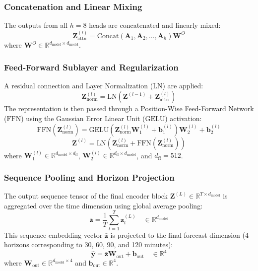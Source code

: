 \documentclass[10pt,journal,compsoc,twocolumn]{IEEEtran}
\begin{document}
\subsubsection{Concatenation and Linear Mixing}
The outputs from all $h = 8$ heads are concatenated and linearly mixed:
\begin{equation}
\mathbf{Z}_{\text{attn}}^{(l)} = \text{Concat}\left(\mathbf{A}_1, \mathbf{A}_2, \dots, \mathbf{A}_h\right)\mathbf{W}^O
\end{equation}
where $\mathbf{W}^O \in \mathbb{R}^{d_{\text{model}} \times d_{\text{model}}}$.

\subsubsection{Feed-Forward Sublayer and Regularization}
A residual connection and Layer Normalization ($\text{LN}$) are applied:
\begin{equation}
\mathbf{Z}_{\text{norm}}^{(l)} = \text{LN}\left(\mathbf{Z}^{(l-1)} + \mathbf{Z}_{\text{attn}}^{(l)}\right)
\end{equation}
The representation is then passed through a Position-Wise Feed-Forward Network ($\text{FFN}$) using the Gaussian Error Linear Unit ($\text{GELU}$) activation:
\begin{equation}
\text{FFN}\left(\mathbf{Z}_{\text{norm}}^{(l)}\right) = \text{GELU}\left(\mathbf{Z}_{\text{norm}}^{(l)}\mathbf{W}_1^{(l)} + \mathbf{b}_1^{(l)}\right)\mathbf{W}_2^{(l)} + \mathbf{b}_2^{(l)}
\end{equation}
\begin{equation}
\mathbf{Z}^{(l)} = \text{LN}\left(\mathbf{Z}_{\text{norm}}^{(l)} + \text{FFN}\left(\mathbf{Z}_{\text{norm}}^{(l)}\right)\right)
\end{equation}
where $\mathbf{W}_1^{(l)} \in \mathbb{R}^{d_{\text{model}} \times d_{\text{ff}}}$, $\mathbf{W}_2^{(l)} \in \mathbb{R}^{d_{\text{ff}} \times d_{\text{model}}}$, and $d_{\text{ff}} = 512$.

\subsubsection{Sequence Pooling and Horizon Projection}
The output sequence tensor of the final encoder block $\mathbf{Z}^{(L)} \in \mathbb{R}^{T \times d_{\text{model}}}$ is aggregated over the time dimension using global average pooling:
\begin{equation}
\bar{\mathbf{z}} = \frac{1}{T} \sum_{t=1}^T \mathbf{z}_t^{(L)} \quad \in \mathbb{R}^{d_{\text{model}}}
\end{equation}
This sequence embedding vector $\bar{\mathbf{z}}$ is projected to the final forecast dimension (4 horizons corresponding to 30, 60, 90, and 120 minutes):
\begin{equation}
\hat{\mathbf{y}} = \bar{\mathbf{z}}\mathbf{W}_{\text{out}} + \mathbf{b}_{\text{out}} \quad \in \mathbb{R}^4
\end{equation}
where $\mathbf{W}_{\text{out}} \in \mathbb{R}^{d_{\text{model}} \times 4}$ and $\mathbf{b}_{\text{out}} \in \mathbb{R}^4$.
\end{document}

